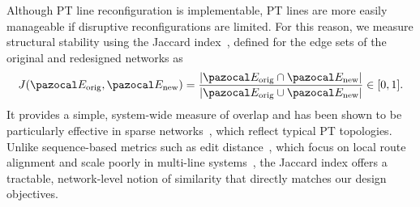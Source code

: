 \documentclass[a4paper,fleqn]{cas-sc}
\begin{document}
Although PT line reconfiguration is implementable, PT lines are more easily manageable if disruptive reconfigurations are limited. For this reason, we measure structural stability using the Jaccard index~\citep{jaccard1901etude}, defined for the edge sets of the original and redesigned networks as
\begin{equation}
J(\pazocal E_{\text{orig}},\pazocal E_{\text{new}})
=\frac{|\pazocal E_{\text{orig}}\cap \pazocal E_{\text{new}}|}
       {|\pazocal E_{\text{orig}}\cup \pazocal E_{\text{new}}|}\in[0,1].
\label{eq:jaccard}
\end{equation}
It provides a simple, system-wide measure of overlap and has been shown to be particularly effective in sparse networks~\citep{travieso2024analytical}, which reflect typical PT topologies. Unlike sequence-based metrics such as edit distance~\citep{cheng2025computing}, which focus on local route alignment and scale poorly in multi-line systems~\citep{jain2024graph}, the Jaccard index offers a tractable, network-level notion of similarity that directly matches our design objectives.
%
\end{document}
